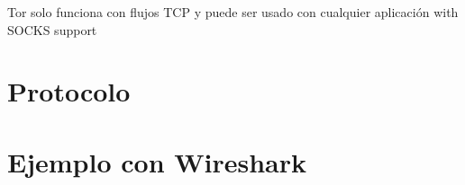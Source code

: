 \documentclass[10pt,a4paper,spanish]{article}
\begin{document}
Tor solo funciona con flujos TCP y puede ser usado con cualquier aplicación with SOCKS support %

\section{Protocolo}

\section{Ejemplo con Wireshark}

\end{document}
